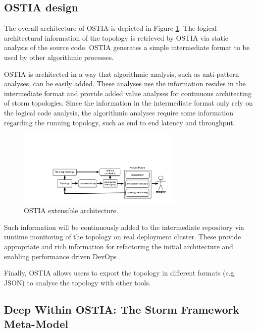 \subsection{OSTIA design}

The overall architecture of OSTIA is depicted in
Figure \ref{arch}. The logical architectural information of the
topology is retrieved by OSTIA via static analysis of the source code. OSTIA
generates a simple intermediate format to be used by other algorithmic
processes.

OSTIA is architected in a way that algorithmic analysis, such as anti-pattern
analyses, can be easily added. These analyses use the information resides in the
intermediate format and provide added value analyses for continuous architecting
of storm topologies. Since the information in the intermediate format only rely
on the logical code analysis, the algorithmic analyses require some
information regarding the running topology, such as end to end latency and
throughput.

\begin{figure}[H]
	\begin{center}
		\includegraphics[width=8cm]{images/ostia-arch}
		\caption{OSTIA extensible architecture.}\label{arch}
	\end{center}
\end{figure}

Such information will be continuously added to the intermediate repository via
runtime monitoring of the topology on real deployment cluster. These provide
appropriate and rich information for refactoring the initial architecture and
enabling performance driven DevOps \cite{brunnert2015performance}.

Finally, OSTIA allows users to export the topology in different formats
(e.g. JSON) to analyse the topology with other tools.


\subsection{Deep Within OSTIA: The Storm Framework Meta-Model}

